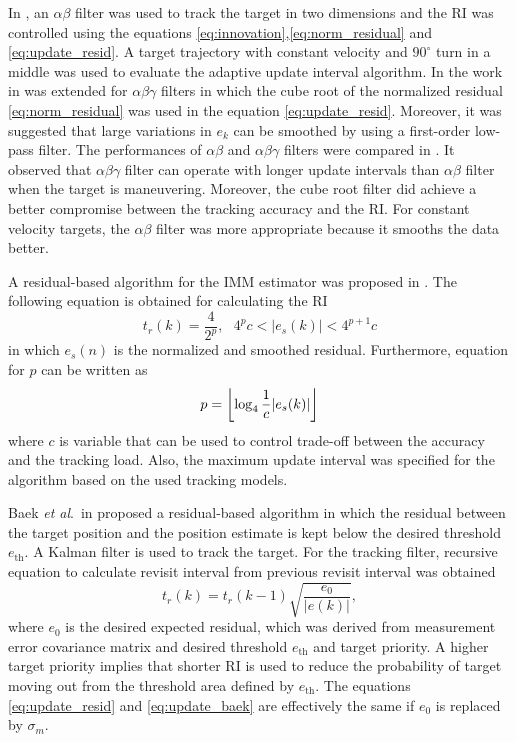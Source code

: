 \documentclass[english, 12pt, a4paper, elec, utf8, a-1b, online]{aaltothesis}
\newcommand{\etal}{\textit{et al}.~}
\newcommand{\ri}{t_r}
\DeclarePairedDelimiter\floor{\lfloor}{\rfloor}
\begin{document}
In \cite{Cohen1986}, an $\alpha \beta$ filter \cite{Brookner1998} was used to track the target in two dimensions and the RI was controlled using the equations \eqref{eq:innovation},\eqref{eq:norm_residual} and \eqref{eq:update_resid}.
A target trajectory with constant velocity and $90^\circ$ turn in a middle was used to evaluate the adaptive update interval algorithm.
In \cite{Gardner1988} the work in \cite{Cohen1986} was extended for $\alpha\beta\gamma$ filters \cite{Brookner1998} in which the cube root of the normalized residual \eqref{eq:norm_residual} was used in the equation \eqref{eq:update_resid}.
Moreover, it was suggested that large variations in $e_k$ can be smoothed by using a first-order low-pass filter.
The performances of $\alpha\beta$ and $\alpha\beta\gamma$ filters were compared in \cite{Munu1992}.
It observed that $\alpha\beta\gamma$ filter can operate with longer update intervals than $\alpha\beta$ filter when the target is maneuvering.
Moreover, the cube root filter did achieve a better compromise between the tracking accuracy and the RI.     
For constant velocity targets, the $\alpha\beta$ filter was more appropriate because it smooths the data better.

A residual-based algorithm for the IMM estimator was proposed in \cite{ChengTing2007}.
The following equation is obtained for calculating the RI
\begin{equation}
    \ri(k) = \frac{4}{2^p}, \text{ } 4^p c < |e_s(k)| < 4^{p+1}c
\end{equation}
in which $e_s(n)$ is the normalized and smoothed residual.
Furthermore, equation for $p$ can be written as
\begin{equation}
    p = \floor*{\log_4\frac{1}{c}|e_s(k)|}
\end{equation}
where $c$ is variable that can be used to control trade-off between the accuracy and the tracking load.
Also, the maximum update interval was specified for the algorithm based on the used tracking models.

Baek \etal in \cite{Baek2010} proposed a residual-based algorithm in which the residual between the target position and the position estimate is kept below the desired threshold $e_\text{th}$.
A Kalman filter is used to track the target.
For the tracking filter, recursive equation to calculate revisit interval from previous revisit interval was obtained
\begin{equation}\label{eq:update_baek}
    \ri(k) = \ri(k - 1) \sqrt{\frac{e_0}{|e(k)|}},
\end{equation}
where $e_0$ is the desired expected residual, which was derived from measurement error covariance matrix and desired threshold $e_\text{th}$ and target priority.
A higher target priority implies that shorter RI is used to reduce the probability of target moving out from the threshold area defined by $e_\text{th}$.
The equations \eqref{eq:update_resid} and \eqref{eq:update_baek} are effectively the same if $e_0$ is replaced by $\sigma_m$.
\end{document}
